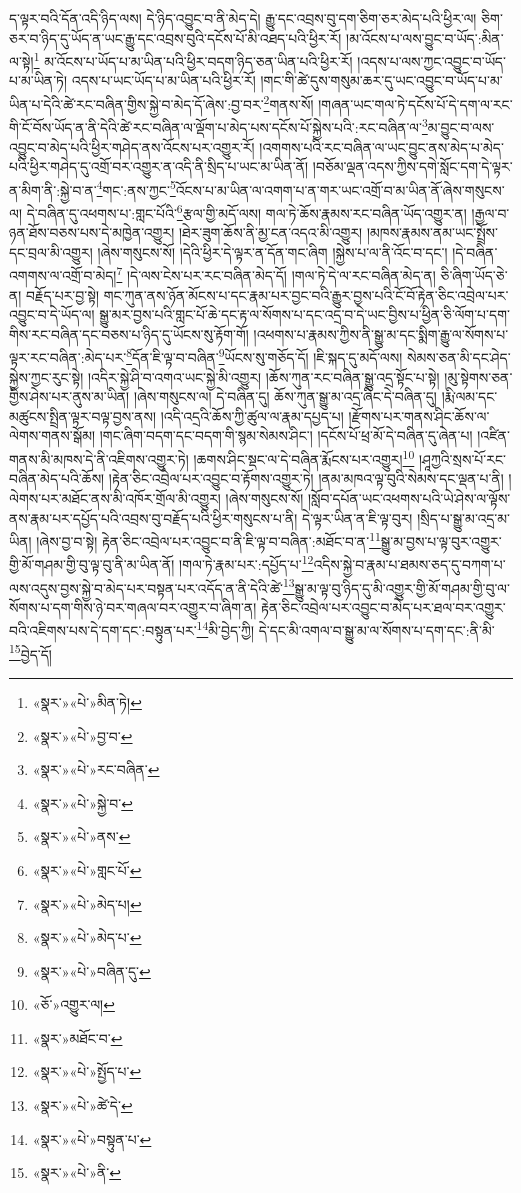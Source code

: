 ད་ལྟར་བའི་དོན་འདི་ཉིད་ལས། དེ་ཉིད་འབྱུང་བ་ནི་མེད་དེ། རྒྱུ་དང་འབྲས་བུ་དག་ཅིག་ཅར་མེད་པའི་ཕྱིར་ལ། ཅིག་ཅར་བ་ཉིད་དུ་ཡོད་ན་ཡང་རྒྱུ་དང་འབྲས་བུའི་དངོས་པོ་མི་འཐད་པའི་ཕྱིར་རོ། །མ་འོངས་པ་ལས་བྱུང་བ་ཡོད་:མིན་ལ་སྟེ།\footnote{«སྣར་»«པེ་»མིན་ཏེ།} མ་འོངས་པ་ཡོད་པ་མ་ཡིན་པའི་ཕྱིར་བདག་ཉིད་ཅན་ཡིན་པའི་ཕྱིར་རོ། །འདས་པ་ལས་ཀྱང་འབྱུང་བ་ཡོད་པ་མ་ཡིན་ཏེ། འདས་པ་ཡང་ཡོད་པ་མ་ཡིན་པའི་ཕྱིར་རོ། །གང་གི་ཚེ་དུས་གསུམ་ཆར་དུ་ཡང་འབྱུང་བ་ཡོད་པ་མ་ཡིན་པ་དེའི་ཚེ་རང་བཞིན་གྱིས་སྐྱེ་བ་མེད་དོ་ཞེས་:བྱ་བར་\footnote{«སྣར་»«པེ་»བྱ་བ་}གནས་སོ། །གཞན་ཡང་གལ་ཏེ་དངོས་པོ་དེ་དག་ལ་རང་གི་ངོ་བོས་ཡོད་ན་ནི་དེའི་ཚེ་རང་བཞིན་ལ་ལྡོག་པ་མེད་པས་དངོས་པོ་སྐྱེས་པའི་:རང་བཞིན་ལ་\footnote{«སྣར་»«པེ་»རང་བཞིན་}མ་བྱུང་བ་ལས་འབྱུང་བ་མེད་པའི་ཕྱིར་གཤེད་ནས་འོངས་པར་འགྱུར་རོ། །འགགས་པའི་རང་བཞིན་ལ་ཡང་བྱུང་ནས་མེད་པ་མེད་པའི་ཕྱིར་གཤེད་དུ་འགྲོ་བར་འགྱུར་ན་འདི་ནི་སྲིད་པ་ཡང་མ་ཡིན་ནོ། །བཅོམ་ལྡན་འདས་ཀྱིས་དགེ་སློང་དག་དེ་ལྟར་ན་མིག་ནི་:སྐྱེ་བ་ན་\footnote{«སྣར་»«པེ་»སྐྱེ་བ་}གང་:ནས་ཀྱང་\footnote{«སྣར་»«པེ་»ནས་}འོངས་པ་མ་ཡིན་ལ་འགག་པ་ན་གར་ཡང་འགྲོ་བ་མ་ཡིན་ནོ་ཞེས་གསུངས་ལ། དེ་བཞིན་དུ་འཕགས་པ་:གླང་པོའི་\footnote{«སྣར་»«པེ་»གླང་པོ་}རྩལ་གྱི་མདོ་ལས། གལ་ཏེ་ཆོས་རྣམས་རང་བཞིན་ཡོད་འགྱུར་ན། །རྒྱལ་བ་ཉན་ཐོས་བཅས་པས་དེ་མཁྱེན་འགྱུར། །ཐེར་ཟུག་ཆོས་ནི་མྱ་ངན་འདའ་མི་འགྱུར། །མཁས་རྣམས་ནམ་ཡང་སྤྲོས་དང་བྲལ་མི་འགྱུར། །ཞེས་གསུངས་སོ། །དེའི་ཕྱིར་དེ་ལྟར་ན་དོན་གང་ཞིག །སྐྱེས་པ་ལ་ནི་འོང་བ་དང་། །དེ་བཞིན་འགགས་ལ་འགྲོ་བ་མེད།\footnote{«སྣར་»«པེ་»མེད་པ།} །དེ་ལས་ངེས་པར་རང་བཞིན་མེད་དོ། །གལ་ཏེ་དེ་ལ་རང་བཞིན་མེད་ན། ཅི་ཞིག་ཡོད་ཅེ་ན། བརྗོད་པར་བྱ་སྟེ། གང་ཀུན་ནས་ཉོན་མོངས་པ་དང་རྣམ་པར་བྱང་བའི་རྒྱུར་བྱས་པའི་ངོ་བོ་རྟེན་ཅིང་འབྲེལ་པར་འབྱུང་བ་དེ་ཡོད་ལ། སྒྱུ་མར་བྱས་པའི་གླང་པོ་ཆེ་དང་རྟ་ལ་སོགས་པ་དང་འདྲ་བ་དེ་ཡང་བྱིས་པ་ཕྱིན་ཅི་ལོག་པ་དག་གིས་རང་བཞིན་དང་བཅས་པ་ཉིད་དུ་ཡོངས་སུ་རྟོག་གོ། །འཕགས་པ་རྣམས་ཀྱིས་ནི་སྒྱུ་མ་དང་སྨིག་རྒྱུ་ལ་སོགས་པ་ལྟར་རང་བཞིན་:མེད་པར་\footnote{«སྣར་»«པེ་»མེད་པ་}དོན་ཇི་ལྟ་བ་བཞིན་\footnote{«སྣར་»«པེ་»བཞིན་དུ་}ཡོངས་སུ་གཅོད་དོ། །ཇི་སྐད་དུ་མདོ་ལས། སེམས་ཅན་མི་དང་ཤེད་སྐྱེས་ཀྱང་རུང་སྟེ། །འདིར་སྐྱེ་ཤི་བ་འགའ་ཡང་སྐྱེ་མི་འགྱུར། །ཆོས་ཀུན་རང་བཞིན་སྒྱུ་འདྲ་སྟོང་པ་སྟེ། །མུ་སྟེགས་ཅན་གྱིས་ཤེས་པར་ནུས་མ་ཡིན། །ཞེས་གསུངས་ལ། དེ་བཞིན་དུ། ཆོས་ཀུན་སྒྱུ་མ་འདྲ་ཞིང་དེ་བཞིན་དུ། །རྨི་ལམ་དང་མཚུངས་སྤྲིན་ལྟར་བལྟ་བྱས་ནས། །འདི་འདྲའི་ཆོས་ཀྱི་ཚུལ་ལ་རྣམ་དཔྱད་པ། །རྫོགས་པར་གནས་ཤིང་ཆོས་ལ་ལེགས་གནས་སྒོམ། །གང་ཞིག་བདག་དང་བདག་གི་སྙམ་སེམས་ཤིང་། །དངོས་པོ་ཕྲ་མོ་དེ་བཞིན་དུ་ཞེན་པ། །འཛིན་གནས་མི་མཁས་དེ་ནི་འཇིགས་འགྱུར་ཏེ། །ཆགས་ཤིང་སྡང་ལ་དེ་བཞིན་རྨོངས་པར་འགྱུར།\footnote{«ཅོ་»འགྱུར་ལ།} །ཤཱཀྱའི་སྲས་པོ་རང་བཞིན་མེད་པའི་ཆོས། །རྟེན་ཅིང་འབྲེལ་པར་འབྱུང་བ་རྟོགས་འགྱུར་ཏེ། །ནམ་མཁའ་ལྟ་བུའི་སེམས་དང་ལྡན་པ་ནི། །ལེགས་པར་མཐོང་ནས་མི་འཁོར་གྲོལ་མི་འགྱུར། །ཞེས་གསུངས་སོ། །སློབ་དཔོན་ཡང་འཕགས་པའི་ཡེ་ཤེས་ལ་ལྟོས་ནས་རྣམ་པར་དཔྱོད་པའི་འབྲས་བུ་བརྗོད་པའི་ཕྱིར་གསུངས་པ་ནི། དེ་ལྟར་ཡིན་ན་ཇི་ལྟ་བུར། །སྲིད་པ་སྒྱུ་མ་འདྲ་མ་ཡིན། །ཞེས་བྱ་བ་སྟེ། རྟེན་ཅིང་འབྲེལ་པར་འབྱུང་བ་ནི་ཇི་ལྟ་བ་བཞིན་:མཐོང་བ་ན་\footnote{«སྣར་»མཐོང་བ་}སྒྱུ་མ་བྱས་པ་ལྟ་བུར་འགྱུར་གྱི་མོ་གཤམ་གྱི་བུ་ལྟ་བུ་ནི་མ་ཡིན་ནོ། །གལ་ཏེ་རྣམ་པར་:དཔྱོད་པ་\footnote{«སྣར་»«པེ་»སྤྱོད་པ་}འདིས་སྐྱེ་བ་རྣམ་པ་ཐམས་ཅད་དུ་བཀག་པ་ལས་འདུས་བྱས་སྐྱེ་བ་མེད་པར་བསྟན་པར་འདོད་ན་ནི་དེའི་ཚེ་\footnote{«སྣར་»«པེ་»ཚེ་དེ་}སྒྱུ་མ་ལྟ་བུ་ཉིད་དུ་མི་འགྱུར་གྱི་མོ་གཤམ་གྱི་བུ་ལ་སོགས་པ་དག་གིས་ཉེ་བར་གཞལ་བར་འགྱུར་བ་ཞིག་ན། རྟེན་ཅིང་འབྲེལ་པར་འབྱུང་བ་མེད་པར་ཐལ་བར་འགྱུར་བའི་འཇིགས་པས་དེ་དག་དང་:བསྟུན་པར་\footnote{«སྣར་»«པེ་»བསྟུན་པ་}མི་བྱེད་ཀྱི། དེ་དང་མི་འགལ་བ་སྒྱུ་མ་ལ་སོགས་པ་དག་དང་:ནི་མི་\footnote{«སྣར་»«པེ་»ནི་}བྱེད་དོ། 